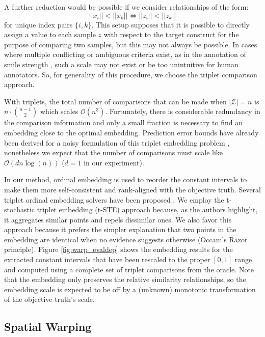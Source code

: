 \documentclass[times,twocolumn,final,authoryear]{elsarticle}
\begin{document}
A further reduction would be possible if we consider relationships of the form:
\begin{equation*}
||x_i|| < ||x_k|| \Longleftrightarrow ||z_i|| < ||z_k||
\end{equation*}
for unique index pairs $\{i,k\}$.  This setup supposes that it is possible to directly assign a value to each sample $z$ with respect to the target construct for the purpose of comparing two samples, but this may not always be possible.  In cases where multiple conflicting or ambiguous criteria exist, as in the annotation of smile strength \citep{Gupta2016}, such a scale may not exist or be too unintuitive for human annotators.  So, for generality of this procedure, we choose the triplet comparison approach.

With triplets, the total number of comparisons that can be made when $|\mathcal{Z}|=n$ is $n\cdot{n-1 \choose 2}$ which scales $\mathcal{O}(n^3)$.  Fortunately, there is considerable redundancy in the comparison information and only a small fraction is necessary to find an embedding close to the optimal embedding.  Prediction error bounds have already been derived for a noisy formulation of this triplet embedding problem \citep{jain2016finite}, nonetheless we expect that the number of comparisons must scale like $\mathcal{O}(dn\log(n))$ ($d=1$ in our experiment).

In our method, ordinal embedding is used to reorder the constant intervals to make them more self-consistent and rank-aligned with the objective truth.  Several triplet ordinal embedding solvers have been proposed \citep{agarwal2007generalized, tamuz2011adaptively, van2012stochastic, amid2015multiview}.  We employ the t-stochastic triplet embedding (t-STE) approach \citep{van2012stochastic} because, as the authors highlight, it aggregates similar points and repels dissimilar ones.  We also favor this approach because it prefers the simpler explanation that two points in the embedding are identical when no evidence suggests otherwise (Occam's Razor principle).  Figure \ref{fig:warp_evaldep} shows the embedding results for the extracted constant intervals that have been rescaled to the proper $[0,1]$ range and computed using a complete set of triplet comparisons from the oracle.  Note that the embedding only preserves the relative similarity relationships, so the embedding scale is expected to be off by a (unknown) monotonic transformation of the objective truth's scale.

\subsection{Spatial Warping}
\end{document}
